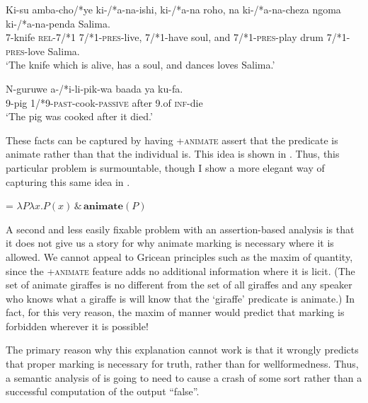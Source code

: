 \documentclass[output=paper,newtxmath,modfonts,nonflat,hidelinks]{langsci/langscibook}
\begin{document}
\ea\label{ex:pesetsky:dancingkisu} \gll Ki-su amba-cho/*ye ki-/*a-na-ishi, ki-/*a-na roho, na ki-/*a-na-cheza ngoma ki-/*a-na-penda Salima. \\    \textsc{7}-knife \textsc{rel}-\textsc{7}/*\textsc{1} \textsc{7}/*\textsc{1}-\textsc{pres}-live, \textsc{7}/*\textsc{1}-have soul, and \textsc{7}/*\textsc{1}-\textsc{pres}-play drum \textsc{7}/*\textsc{1}-\textsc{pres}-love Salima. \\  \glt `The knife which is alive, has a soul, and dances loves Salima.' \\ \z
   
\ea\label{ex:pesetsky:pikwapigga} \gll N-guruwe a-/*i-li-pik-wa baada ya ku-fa. \\   \textsc{9}-pig \textsc{1}/*\textsc{9}-\textsc{past}-cook-\textsc{passive} after \textsc{9}.of \textsc{inf}-die \\ \glt `The pig was cooked after it died.'  \\ \z 

These facts can be captured by having +\textsc{animate} assert that the predicate is animate rather than that the individual is.  This idea is shown in .  Thus, this particular problem is surmountable, though I show a more elegant way of capturing this same idea in . 

\ea\label{ex:pesetsky:assertanimatepredicates}  = $\lambda P \lambda x . P(x) \, \& \, \textbf{animate}(P) $ \\ \z

A second and less easily fixable problem with an assertion-based analysis is that it does not give us a story for why animate marking is necessary where it is allowed.  We cannot appeal to Gricean principles such as the maxim of quantity, since the +\textsc{animate} feature adds no additional information where it is licit.  (The set of animate giraffes is no different from the set of all giraffes and any speaker who knows what a giraffe is will know that the ‘giraffe’ predicate is animate.)  In fact, for this very reason, the maxim of manner would predict that  marking is forbidden wherever it is possible!

The primary reason why this explanation cannot work is that it wrongly predicts that proper  marking is necessary for truth, rather than for wellformedness. Thus, a semantic analysis of  is going to need to cause a crash of some sort rather than a successful computation of the output ``false''.
\end{document}
